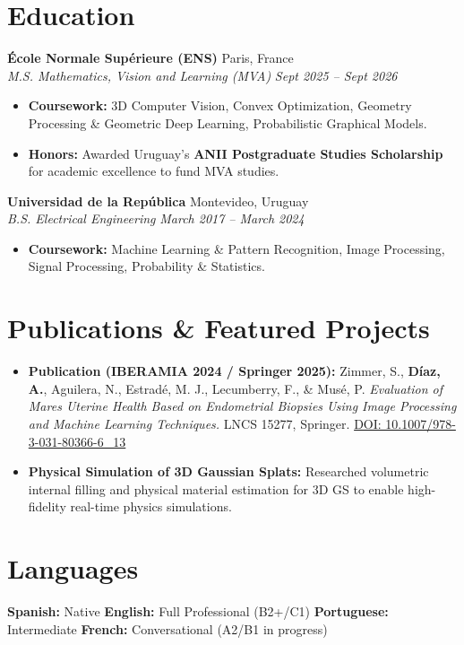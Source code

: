 \documentclass[10pt, a4paper]{article}
\newcommand{\entryheader}[4]{
    \noindent \textbf{#1} \hfill #2 \\
    \textit{#3} \hfill \textit{#4} \vspace{1pt}
}
\begin{document}
\section{Education}

\entryheader{École Normale Supérieure (ENS)}{Paris, France}{M.S. Mathematics, Vision and Learning (MVA)}{Sept 2025 -- Sept 2026}
\begin{itemize}
    \item \textbf{Coursework:} 3D Computer Vision, Convex Optimization, Geometry Processing \& Geometric Deep Learning, Probabilistic Graphical Models.
    \item \textbf{Honors:} Awarded Uruguay's \textbf{ANII Postgraduate Studies Scholarship} for academic excellence to fund MVA studies.
\end{itemize}
\vspace{3pt}

\entryheader{Universidad de la República}{Montevideo, Uruguay}{B.S. Electrical Engineering}{March 2017 -- March 2024}
\begin{itemize}
    \item \textbf{Coursework:} Machine Learning \& Pattern Recognition, Image Processing, Signal Processing, Probability \& Statistics.
\end{itemize}

\section{Publications \& Featured Projects}
\begin{itemize}
    \item \textbf{Publication (IBERAMIA 2024 / Springer 2025):} Zimmer, S., \textbf{Díaz, A.}, Aguilera, N., Estradé, M. J., Lecumberry, F., \& Musé, P. \textit{Evaluation of Mares Uterine Health Based on Endometrial Biopsies Using Image Processing and Machine Learning Techniques.} LNCS 15277, Springer. \href{https://doi.org/10.1007/978-3-031-80366-6_13}{DOI: 10.1007/978-3-031-80366-6\_13}
    \item \textbf{Physical Simulation of 3D Gaussian Splats:} Researched volumetric internal filling and physical material estimation for 3D GS to enable high-fidelity real-time physics simulations.
\end{itemize}

\section{Languages}
\textbf{Spanish:} Native \quad \textbar{} \quad \textbf{English:} Full Professional (B2+/C1) \quad \textbar{} \quad \textbf{Portuguese:} Intermediate \quad \textbar{} \quad \textbf{French:} Conversational (A2/B1 in progress)
\end{document}
